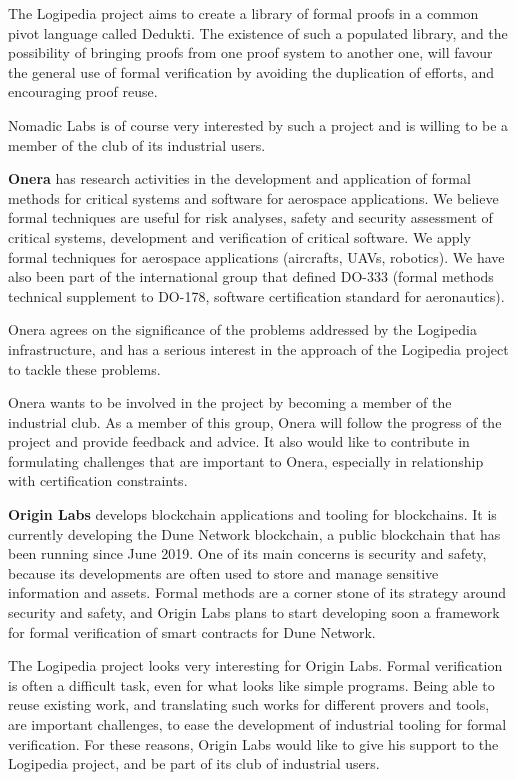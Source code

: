 {The Logipedia project aims to create a library of formal proofs in a
common pivot language called Dedukti. The existence of such a
populated library, and the possibility of bringing proofs from one
proof system to another one, will favour the general use of formal
verification by avoiding the duplication of efforts, and encouraging
proof reuse.

Nomadic Labs is of course very interested by such a project and is
willing to be a member of the club of its industrial users.


{\bf Onera} has research activities in the development and application
of formal methods for critical systems and software for aerospace
applications. We believe formal techniques are useful for risk
analyses, safety and security assessment of critical systems,
development and verification of critical software. We apply formal
techniques for aerospace applications (aircrafts, UAVs, robotics). We
have also been part of the international group that defined DO-333
(formal methods technical supplement to DO-178, software certification
standard for aeronautics).

Onera agrees on the significance of the problems addressed by the
Logipedia infrastructure, and has a serious interest in the approach
of the Logipedia project to tackle these problems.

Onera wants to be involved in the project by becoming a member of the
industrial club. As a member of this group, Onera will follow the
progress of the project and provide feedback and advice. It also would
like to contribute in formulating challenges that are important to
Onera, especially in relationship with certification constraints.

{\bf Origin Labs} develops blockchain applications and tooling for
blockchains. It is currently developing the Dune Network blockchain, a
public blockchain that has been running since June 2019. One of its
main concerns is security and safety, because its developments are
often used to store and manage sensitive information and
assets. Formal methods are a corner stone of its strategy around
security and safety, and Origin Labs plans to start developing soon a
framework for formal verification of smart contracts for Dune Network.

The Logipedia project looks very interesting for Origin Labs. Formal
verification is often a difficult task, even for what looks like
simple programs. Being able to reuse existing work, and translating
such works for different provers and tools, are important challenges,
to ease the development of industrial tooling for formal
verification. For these reasons, Origin Labs would like to give his
support to the Logipedia project, and be part of its club of
industrial users.

}
